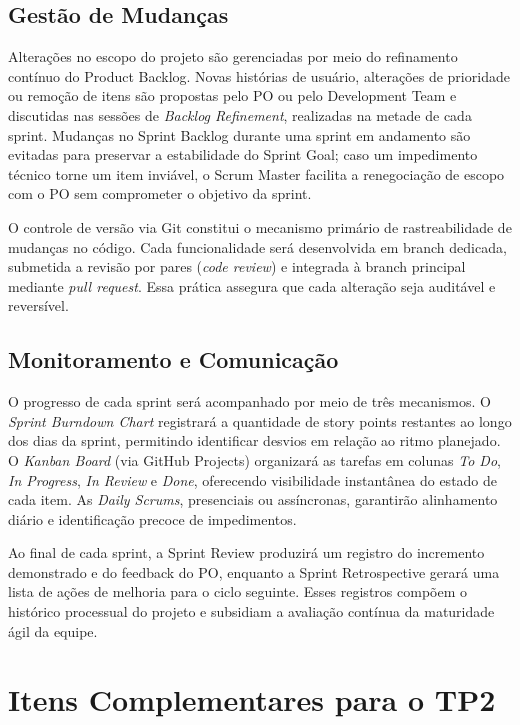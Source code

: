\documentclass[12pt, a4paper]{article}
\begin{document}
\subsection{Gestão de Mudanças}

Alterações no escopo do projeto são gerenciadas por meio do refinamento contínuo do Product Backlog. Novas histórias de usuário, alterações de prioridade ou remoção de itens são propostas pelo PO ou pelo Development Team e discutidas nas sessões de \textit{Backlog Refinement}, realizadas na metade de cada sprint. Mudanças no Sprint Backlog durante uma sprint em andamento são evitadas para preservar a estabilidade do Sprint Goal; caso um impedimento técnico torne um item inviável, o Scrum Master facilita a renegociação de escopo com o PO sem comprometer o objetivo da sprint.

O controle de versão via Git constitui o mecanismo primário de rastreabilidade de mudanças no código. Cada funcionalidade será desenvolvida em branch dedicada, submetida a revisão por pares (\textit{code review}) e integrada à branch principal mediante \textit{pull request}. Essa prática assegura que cada alteração seja auditável e reversível.

\subsection{Monitoramento e Comunicação}

O progresso de cada sprint será acompanhado por meio de três mecanismos. O \textit{Sprint Burndown Chart} registrará a quantidade de story points restantes ao longo dos dias da sprint, permitindo identificar desvios em relação ao ritmo planejado. O \textit{Kanban Board} (via GitHub Projects) organizará as tarefas em colunas \textit{To Do}, \textit{In Progress}, \textit{In Review} e \textit{Done}, oferecendo visibilidade instantânea do estado de cada item. As \textit{Daily Scrums}, presenciais ou assíncronas, garantirão alinhamento diário e identificação precoce de impedimentos.

Ao final de cada sprint, a Sprint Review produzirá um registro do incremento demonstrado e do feedback do PO, enquanto a Sprint Retrospective gerará uma lista de ações de melhoria para o ciclo seguinte. Esses registros compõem o histórico processual do projeto e subsidiam a avaliação contínua da maturidade ágil da equipe.

\section{Itens Complementares para o TP2}
\end{document}
